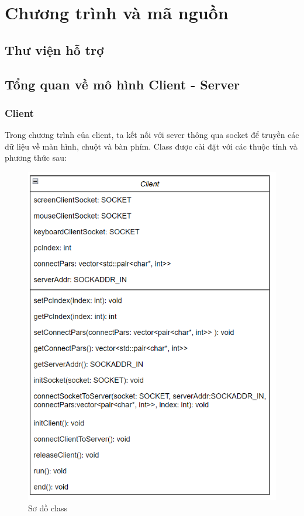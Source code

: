 
\chapter{Chương trình và mã nguồn}\label{Chapter 2}
\section{Thư viện hỗ trợ}
\section{Tổng quan về mô hình Client - Server}
\subsection{Client}
Trong chương trình của client, ta kết nối với sever thông qua socket để truyền các dữ liệu về màn hình, chuột và bàn phím.
Class \textbf{} được cài đặt với các thuộc tính và phương thức sau:
    \begin{figure}[H]
	\begin{center}
		\includegraphics[scale=1.3]{img/client}
            \caption{Sơ đồ class \textbf{}}
	\end{center}
		
    \end{figure}

